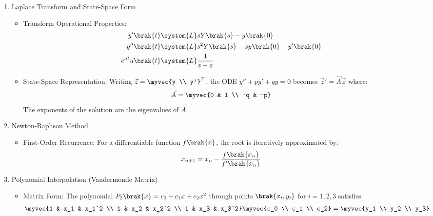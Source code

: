 \begin{enumerate}[label=\thesubsection.\arabic*, ref=\thesubsection.\theenumi,itemsep=0pt]
\item Laplace Transform and State-Space Form
\begin{itemize}
\item Transform Operational Properties:
\begin{align}
y'\brak{t} &\system{L} s Y\brak{s} - y\brak{0} \label{eq:lap1} \\ %
y''\brak{t} &\system{L} s^2 Y\brak{s} - s y\brak{0} - y'\brak{0} \label{eq:lap2} \\ %
e^{at} u\brak{t} &\system{L} \frac{1}{s - a} \label{eq:lapexp} %
\end{align}
\item State-Space Representation:
Writing $\vec{z} = \myvec{y \\ y'}^\top$, the ODE $y'' + p y' + q y = 0$ becomes $\vec{z}' = \vec{A}\vec{z}$ where:
\begin{align}
\vec{A} = \myvec{0 & 1 \\ -q & -p}
\label{eq:ss} %
\end{align}
The exponents of the solution are the eigenvalues of $\vec{A}$.
\end{itemize}

\item Newton-Raphson Method
\begin{itemize}
\item First-Order Recurrence:
For a differentiable function $f\brak{x}$, the root is iteratively approximated by:
\begin{align}
x_{n+1} = x_n - \frac{f\brak{x_n}}{f'\brak{x_n}}
\label{eq:nr} %
\end{align}
\end{itemize}

\item Polynomial Interpolation (Vandermonde Matrix)
\begin{itemize}
\item Matrix Form:
The polynomial $P_2\brak{x} = c_0 + c_1 x + c_2 x^2$ through points $\brak{x_i, y_i}$ for $i=1,2,3$ satisfies:
\begin{align}
\myvec{1 & x_1 & x_1^2 \\ 1 & x_2 & x_2^2 \\ 1 & x_3 & x_3^2} \myvec{c_0 \\ c_1 \\ c_2} = \myvec{y_1 \\ y_2 \\ y_3}
\label{eq:vander} %
\end{align}
\end{itemize}


\end{enumerate}
